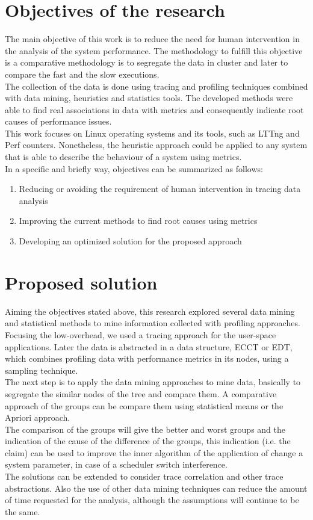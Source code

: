 \section{Objectives of the research}  %
The main objective of this work is to reduce the need for human intervention in the analysis of the system performance. The methodology to fulfill this objective is a comparative methodology is to segregate the data in cluster and later to compare the fast and the slow executions.\\
The collection of the data is done using tracing and profiling techniques combined with data mining, heuristics and statistics tools. The developed methods were able to find real associations in data with metrics and consequently indicate root causes of performance issues.\\
This work focuses on Linux operating systems and its tools, such as LTTng and Perf counters. Nonetheless, the heuristic approach could be applied to any system that is able to describe the behaviour of a system using metrics.\\
In a specific and briefly way, objectives can be summarized as follows:\\
\begin{enumerate}
\item Reducing or avoiding the requirement of human intervention in tracing data analysis
\item Improving the current methods to find root causes using metrics
\item Developing an optimized solution for the proposed approach
\end{enumerate}
\section{Proposed solution}  %
Aiming the objectives stated above, this research explored several data mining and statistical methods to mine information collected with profiling approaches. Focusing the low-overhead, we used a tracing approach for the user-space applications. Later the data is abstracted in a data structure, ECCT or EDT, which combines profiling data with performance metrics in its nodes, using a sampling technique.\\
The next step is to apply the data mining approaches to mine data, basically to segregate the similar nodes of the tree and compare them. A comparative approach of the groups can be compare them using statistical means or the Apriori approach.\\
The comparison of the groups will give the better and worst groups and the indication of the cause of the difference of the groups, this indication (i.e. the claim) can be used to improve the inner algorithm of the application of change a system parameter, in case of a scheduler switch interference.\\
The solutions can be extended to consider trace correlation and other trace abstractions. Also the use of other data mining techniques can reduce the amount of time requested for the analysis, although the assumptions will continue to be the same.

